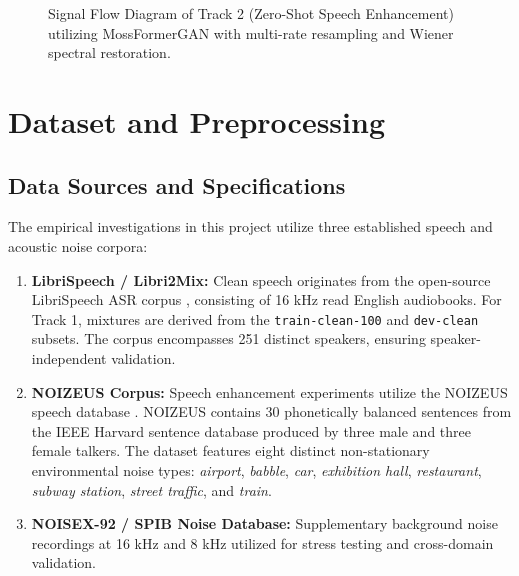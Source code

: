 \documentclass[11pt,a4paper]{report}
\begin{document}
\begin{figure}[H]
\caption{Signal Flow Diagram of Track 2 (Zero-Shot Speech Enhancement) utilizing MossFormerGAN with multi-rate resampling and Wiener spectral restoration.}
\label{fig:task2_signal_flow}
\end{figure}

\chapter{Dataset and Preprocessing}
\label{chap:datasets}

\section{Data Sources and Specifications}
The empirical investigations in this project utilize three established speech and acoustic noise corpora:
\begin{enumerate}
    \item \textbf{LibriSpeech / Libri2Mix:} Clean speech originates from the open-source LibriSpeech ASR corpus \cite{panayotov2015librispeech}, consisting of 16 kHz read English audiobooks. For Track 1, mixtures are derived from the \texttt{train-clean-100} and \texttt{dev-clean} subsets. The corpus encompasses 251 distinct speakers, ensuring speaker-independent validation.
    \item \textbf{NOIZEUS Corpus:} Speech enhancement experiments utilize the NOIZEUS speech database \cite{loizou2013speech}. NOIZEUS contains 30 phonetically balanced sentences from the IEEE Harvard sentence database produced by three male and three female talkers. The dataset features eight distinct non-stationary environmental noise types: \textit{airport}, \textit{babble}, \textit{car}, \textit{exhibition hall}, \textit{restaurant}, \textit{subway station}, \textit{street traffic}, and \textit{train}.
    \item \textbf{NOISEX-92 / SPIB Noise Database:} Supplementary background noise recordings at 16 kHz and 8 kHz utilized for stress testing and cross-domain validation.
\end{enumerate}
\end{document}
